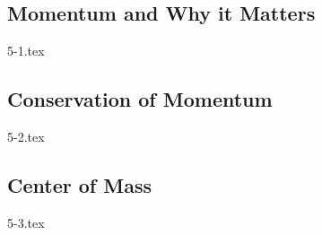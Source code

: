 \subsection{Momentum and Why it Matters}

{5-1.tex}

\subsection{Conservation of Momentum}

{5-2.tex}

\subsection{Center of Mass}

{5-3.tex}